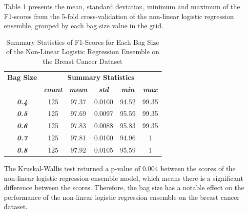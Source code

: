 \documentclass[10pt, conference]{IEEEtran}
\begin{document}
Table \ref{table: BC_bagsize_nonlinear_performance_metrics} presents the mean, standard deviation, minimum and maximum of the
F1-scores from the 5-fold cross-validation of the non-linear logistic regression ensemble, grouped by each bag size
value in the grid.
\begin{table}[H]
    \caption{Summary Statistics of F1-Scores for Each Bag Size of the Non-Linear Logistic Regression Ensemble on the Breast Cancer Dataset}
    \begin{center}
        \begin{tabular}{|c||c|c|c|c|c|}
            \hline
            \textbf{Bag Size}&\multicolumn{5}{|c|}{\textbf{Summary Statistics}} \\
            \cline{2-6}
                                &\textbf{\textit{count}} & \textbf{\textit{mean}} & \textbf{\textit{std}} & \textbf{\textit{min}} & \textbf{\textit{max}}\\
            \hline
            \textbf{\textit{0.4}} & 125 & 97.37 & 0.0100 & 94.52 & 99.35 \\
            \textbf{\textit{0.5}} & 125 & 97.69 & 0.0097 & 95.59 & 99.35 \\
            \textbf{\textit{0.6}} & 125 & 97.83 & 0.0088 & 95.83 & 99.35 \\
            \textbf{\textit{0.7}} & 125 & 97.81 & 0.0100 & 94.96 & 1 \\
            \textbf{\textit{0.8}} & 125 & 97.92 & 0.0105 & 95.59 & 1 \\
            \hline
        \end{tabular}
    \end{center}
    \label{table: BC_bagsize_nonlinear_performance_metrics}
\end{table}
The Kruskal-Wallis test returned a p-value of 0.004 between the scores of the non-linear logistic regression ensemble model,
which means there is a significant difference between the scores. Therefore, the bag size has a notable effect on the
performance of the non-linear logistic regression ensemble on the breast cancer dataset.
\end{document}
